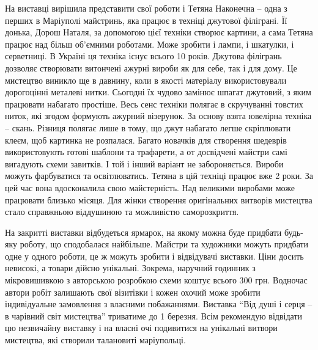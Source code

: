 На виставці вирішила представити свої роботи і  Тетяна Наконечна – одна з
перших в Маріуполі майстринь, яка працює в техніці джутової філіграні. Її
донька, Дорош Наталя, за  допомогою цієї техніки створює картини, а сама Тетяна
працює над більш об'ємними роботами. Може зробити і лампи, і шкатулки, і
серветниці. В Україні ця техніка існує всього 10 років. Джутова філігрань
дозволяє створювати витончені ажурні вироби як для себе, так і  для дому. Це
мистецтво виникло ще в давнину, коли в якості матеріалу використовували
дорогоцінні металеві нитки. Сьогодні їх чудово замінює шпагат джутовий, з яким
працювати набагато простіше. Весь сенс техніки полягає в скручуванні товстих
ниток, які згодом формують ажурний візерунок. За основу взята ювелірна техніка
– скань. Різниця полягає лише в тому, що джут набагато легше скріплювати клеєм,
щоб картинка не розпалася. Багато новачків для створення шедеврів
використовують готові шаблони та трафарети, а от досвідчені майстри самі
вигадують схеми завитків. І той і інший варіант не забороняється. Вироби можуть
фарбуватися та освітлюватись. Тетяна в цій техніці працює вже 2 роки. За цей
час вона вдосконалила свою майстерність. Над великими виробами може працювати
близько місяця. Для жінки створення оригінальних витворів мистецтва стало
справжньою віддушиною та можливістю саморозкриття.


На закритті виставки відбудеться ярмарок, на якому можна буде придбати будь-яку
роботу, що сподобалася найбільше. Майстри та художники можуть придбати одне у
одного роботи, це ж можуть зробити і відвідувачі виставки. Ціни досить
невисокі, а товари дійсно унікальні. Зокрема, наручний годинник з мікровишивкою
з авторською розробкою схеми коштує всього 300 грн. Водночас автори робіт
залишають свої візитівки і кожен охочий може зробити індивідуальне замовлення з
власними побажаннями. Виставка \enquote{Від душі і серця – в чарівний світ мистецтва}
триватиме до 1 березня. Всім рекомендую відвідати цю незвичайну виставку і на
власні очі подивитися на унікальні витвори мистецтва, які створили талановиті
маріупольці.

